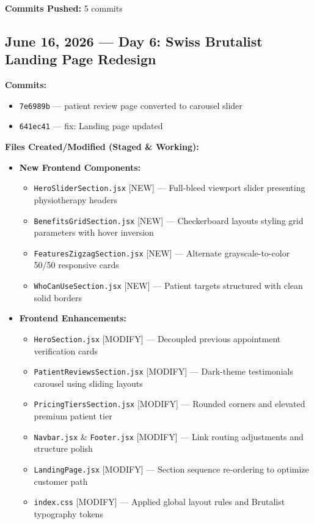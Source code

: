 \documentclass[11pt,a4paper]{article}
\begin{document}
\begin{itemize}
{\textbf{Commits Pushed:} 5 commits

\newpage

\subsection{June 16, 2026 — Day 6: Swiss Brutalist Landing Page Redesign}

\textbf{Commits:}
\begin{itemize}
  \item \texttt{7e6989b} --- patient review page converted to carousel slider
  \item \texttt{641ec41} --- fix: Landing page updated
\end{itemize}

\textbf{Files Created/Modified (Staged \& Working):}
\begin{itemize}
  \item \textbf{New Frontend Components:}
    \begin{itemize}
      \item \texttt{HeroSliderSection.jsx} [NEW] --- Full-bleed viewport slider presenting physiotherapy headers
      \item \texttt{BenefitsGridSection.jsx} [NEW] --- Checkerboard layouts styling grid parameters with hover inversion
      \item \texttt{FeaturesZigzagSection.jsx} [NEW] --- Alternate grayscale-to-color 50/50 responsive cards
      \item \texttt{WhoCanUseSection.jsx} [NEW] --- Patient targets structured with clean solid borders
    \end{itemize}
  \item \textbf{Frontend Enhancements:}
    \begin{itemize}
      \item \texttt{HeroSection.jsx} [MODIFY] --- Decoupled previous appointment verification cards
      \item \texttt{PatientReviewsSection.jsx} [MODIFY] --- Dark-theme testimonials carousel using sliding layouts
      \item \texttt{PricingTiersSection.jsx} [MODIFY] --- Rounded corners and elevated premium patient tier
      \item \texttt{Navbar.jsx} \& \texttt{Footer.jsx} [MODIFY] --- Link routing adjustments and structure polish
      \item \texttt{LandingPage.jsx} [MODIFY] --- Section sequence re-ordering to optimize customer path
      \item \texttt{index.css} [MODIFY] --- Applied global layout rules and Brutalist typography tokens
    \end{itemize}
\end{itemize}

}
\end{itemize}
\end{document}

